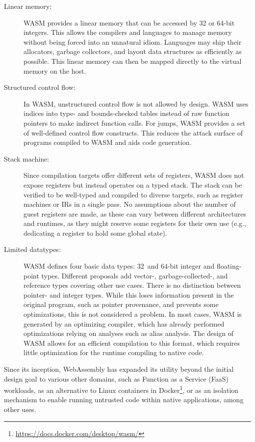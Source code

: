 \begin{description}
    \item[Linear memory:] \Ac{WASM} provides a linear memory that can be accessed by 32 or 64-bit integers.
    This allows the compilers and languages to manage memory without being forced into an unnatural idiom.
    Languages may ship their allocators, garbage collectors, and layout data structures as efficiently as possible.
    This linear memory can then be mapped directly to the virtual memory on the host.
    \item[Structured control flow:] In \ac{WASM}, unstructured control flow is not allowed by design.
    \ac{WASM} uses indices into type- and bounds-checked tables instead of raw function pointers to make indirect function calls.
    For jumps, \ac{WASM} provides a set of well-defined control flow constructs.
    This reduces the attack surface of programs compiled to \ac{WASM} and aids code generation.
    \item[Stack machine:] Since compilation targets offer different sets of registers, \ac{WASM} does not expose registers but instead operates on a typed stack.
    The stack can be verified to be well-typed and compiled to diverse targets, such as register machines or \acp{IR} in a single pass.
    No assumptions about the number of guest registers are made, as these can vary between different architectures and runtimes, as they might reserve some registers for their own use (e.g., dedicating a register to hold some global state).
    \item[Limited datatypes:] \Ac{WASM} defines four basic data types: 32\, and 64-bit integer and floating-point types.
    Different proposals add \mbox{vector-}, \mbox{garbage-collected-}, and reference types covering other use cases.
    There is no distinction between pointer- and integer types.
    While this loses information present in the original program, such as pointer provenance, and prevents some optimizations, this is not considered a problem.
    In most cases, \ac{WASM} is generated by an optimizing compiler, which has already performed optimizations relying on analyses such as alias analysis.
    The design of \ac{WASM} allows for an efficient compilation to this format, which requires little optimization for the runtime compiling to native code.
\end{description}

Since its inception, WebAssembly has expanded its utility beyond the initial design goal to various other domains, such as Function as a Service (FaaS) workloads, as an alternative to Linux containers in Docker\footnote{\url{https://docs.docker.com/desktop/wasm/}}, or as an isolation mechanism to enable running untrusted code within native applications, among other uses.

